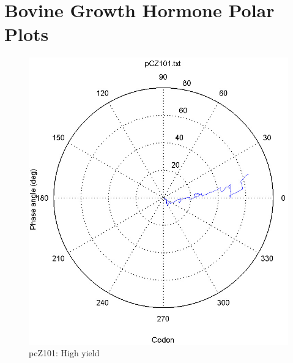 \documentclass[10pt,twocolumn,draft]{article}
\newenvironment{cfigure}{\begin{figure}\begin{center}}{\end{center}\end{figure}}
\begin{document}
\appendix
\section{Bovine Growth Hormone Polar Plots}
\begin{cfigure}
    \caption{pcZ101: High yield}
    \includegraphics[scale=0.4]{pcZ101}
\end{cfigure}
\end{document}
